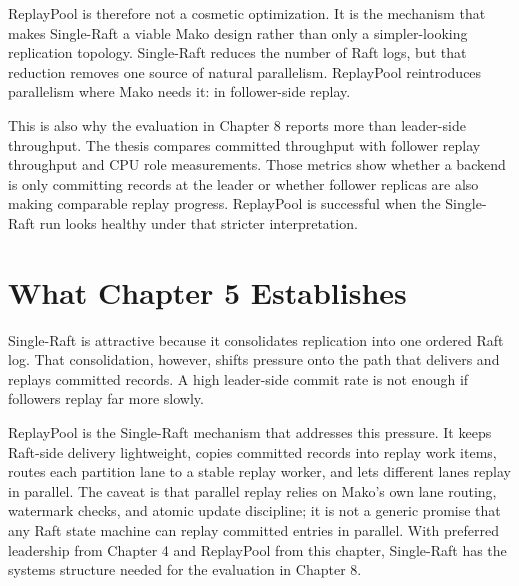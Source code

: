 ReplayPool is therefore not a cosmetic optimization. It is the mechanism that
makes Single-Raft a viable Mako design rather than only a simpler-looking
replication topology. Single-Raft reduces the number of Raft logs, but that
reduction removes one source of natural parallelism. ReplayPool reintroduces
parallelism where Mako needs it: in follower-side replay.

This is also why the evaluation in Chapter 8 reports more than leader-side
throughput. The thesis compares committed throughput with follower replay
throughput and CPU role measurements. Those metrics show whether a backend is
only committing records at the leader or whether follower replicas are also
making comparable replay progress. ReplayPool is successful when the
Single-Raft run looks healthy under that stricter interpretation.

\section{What Chapter 5 Establishes}

Single-Raft is attractive because it consolidates replication into one ordered
Raft log. That consolidation, however, shifts pressure onto the path that
delivers and replays committed records. A high leader-side commit rate is not
enough if followers replay far more slowly.

ReplayPool is the Single-Raft mechanism that addresses this pressure. It keeps
Raft-side delivery lightweight, copies committed records into replay work
items, routes each partition lane to a stable replay worker, and lets different
lanes replay in parallel. The caveat is that parallel replay relies on Mako's
own lane routing, watermark checks, and atomic update discipline; it is not a
generic promise that any Raft state machine can replay committed entries in
parallel. With preferred leadership from Chapter 4 and ReplayPool from this
chapter, Single-Raft has the systems structure needed for the evaluation in
Chapter 8.
